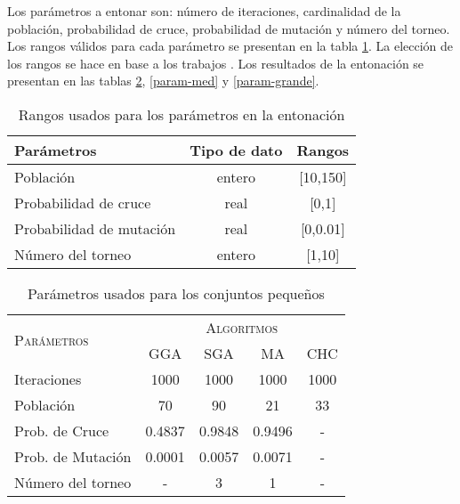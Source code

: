 Los parámetros a entonar son: número de iteraciones, cardinalidad de la población, probabilidad de cruce, probabilidad de mutación y número del torneo. Los rangos válidos para cada parámetro se presentan en la tabla \ref{rangos}. La elección de los rangos se hace en base a los trabajos \cite{de2004reduccion,de2004reduccion,garcia2012prototype,garcia2008memetic,talbi2009metaheuristics}. Los resultados de la entonación se presentan en las tablas \ref{param-peq}, \ref{param-med} y \ref{param-grande}.

\begin{table}[]
\centering
\begin{tabular}{l c c}
\hline
Parámetros & Tipo de dato & Rangos \\
\hline
\hline

Población                & entero           &  [10,150]       \\
Probabilidad de cruce    & real             &  [0,1]          \\
Probabilidad de mutación & real             &  [0,0.01]      \\
Número del torneo        & entero           &  [1,10]         \\  

\hline
\end{tabular}
\caption{Rangos usados para los parámetros en la entonación}
\label{rangos}
\end{table}

\begin{table}[]
\centering
\begin{tabular}{l c c c c}
\hline
\multirow{2}{*}{\textsc{Parámetros}}
	& \multicolumn{4}{c}{\textsc{Algoritmos}} \\
	& GGA & SGA & MA & CHC \\
\hline
\hline
Iteraciones             &  1000    &  1000    &  1000      &  1000 \\
Población               &    70    &    90    &    21      &    33 \\
Prob. de Cruce          &   0.4837 &   0.9848 &     0.9496 &     - \\
Prob. de Mutación       &   0.0001 &  0.0057  &     0.0071 &     - \\
Número del torneo       &   -      &    3     &     1      &     - \\
\hline
\end{tabular}
\caption{Parámetros usados para los conjuntos pequeños}
\label{param-peq}
\end{table}


